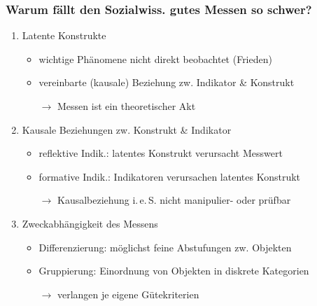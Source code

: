 \documentclass{beamer}
\begin{document}
\begin{frame}
  \frametitle{Warum fällt den Sozialwiss. gutes Messen so schwer?}
  \begin{enumerate}
    \item Latente Konstrukte
    \begin{itemize}
      \item wichtige Phänomene nicht direkt beobachtet (Frieden)
      \item {\glqq}vereinbarte{\grqq} (kausale) Beziehung zw. Indikator \& Konstrukt
      \item [$\rightarrow$] Messen ist ein theoretischer Akt
    \end{itemize}
    \item Kausale Beziehungen zw. Konstrukt \& Indikator
    \begin{itemize}
      \item reflektive Indik.: latentes Konstrukt verursacht Messwert
      \item formative Indik.: Indikatoren verursachen latentes Konstrukt
      \item [$\rightarrow$] Kausalbeziehung i.\,e.\,S. nicht manipulier- oder prüfbar
    \end{itemize}
    \item Zweckabhängigkeit des Messens
    \begin{itemize}
      \item Differenzierung: möglichst feine Abstufungen zw. Objekten
      \item Gruppierung: Einordnung von Objekten in diskrete Kategorien
      \item [$\rightarrow$] verlangen je eigene Gütekriterien
    \end{itemize}
  \end{enumerate}
\end{frame}
\end{document}
